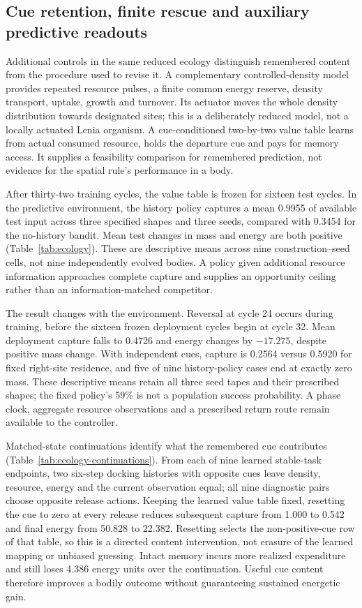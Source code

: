 \subsection*{Cue retention, finite rescue and auxiliary predictive readouts}
Additional controls in the same reduced ecology distinguish remembered content from the procedure used to revise it. A complementary controlled-density model provides repeated resource pulses, a finite common energy reserve, density transport, uptake, growth and turnover. Its actuator moves the whole density distribution towards designated sites; this is a deliberately reduced model, not a locally actuated Lenia organism. A cue-conditioned two-by-two value table learns from actual consumed resource, holds the departure cue and pays for memory access. It supplies a feasibility comparison for remembered prediction, not evidence for the spatial rule's performance in a body.

After thirty-two training cycles, the value table is frozen for sixteen test cycles. In the predictive environment, the history policy captures a mean 0.9955 of available test input across three specified shapes and three seeds, compared with 0.3454 for the no-history bandit. Mean test changes in mass and energy are both positive (Table~\ref{tab:ecology}). These are descriptive means across nine construction--seed cells, not nine independently evolved bodies. A policy given additional resource information approaches complete capture and supplies an opportunity ceiling rather than an information-matched competitor.



The result changes with the environment. Reversal at cycle 24 occurs during training, before the sixteen frozen deployment cycles begin at cycle 32. Mean deployment capture falls to 0.4726 and energy changes by $-17.275$, despite positive mass change. With independent cues, capture is 0.2564 versus 0.5920 for fixed right-site residence, and five of nine history-policy cases end at exactly zero mass. These descriptive means retain all three seed tapes and their prescribed shapes; the fixed policy's 59\% is not a population success probability. A phase clock, aggregate resource observations and a prescribed return route remain available to the controller.

Matched-state continuations identify what the remembered cue contributes (Table~\ref{tab:ecology-continuations}). From each of nine learned stable-task endpoints, two six-step docking histories with opposite cues leave density, resource, energy and the current observation equal; all nine diagnostic pairs choose opposite release actions. Keeping the learned value table fixed, resetting the cue to zero at every release reduces subsequent capture from 1.000 to 0.542 and final energy from 50.828 to 22.382. Resetting selects the non-positive-cue row of that table, so this is a directed content intervention, not erasure of the learned mapping or unbiased guessing. Intact memory incurs more realized expenditure and still loses 4.386 energy units over the continuation. Useful cue content therefore improves a bodily outcome without guaranteeing sustained energetic gain.

